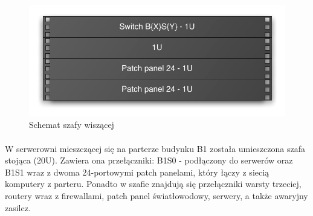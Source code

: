 \begin{figure}[H]
  \begin{center}
    \includegraphics[width=\textwidth]{img/s/szafa-mala.pdf}
    \caption{Schemat szafy wiszącej}
  \end{center}
\end{figure}

\paragraph{}
W serwerowni mieszczącej się na parterze budynku B1 została umieszczona szafa stojąca (20U).
Zawiera ona przełączniki: B1S0 - podłączony do serwerów oraz B1S1 wraz z dwoma 24-portowymi patch panelami, który łączy z siecią komputery z parteru.
Ponadto w szafie znajdują się przełączniki warsty trzeciej, routery wraz z firewallami, patch panel światłowodowy, serwery, a także awaryjny zasilcz.


